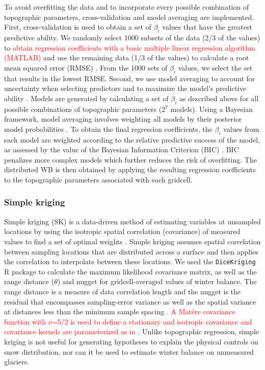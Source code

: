 \documentclass[review,oneside, letterpaper]{igs}
\begin{document}
To avoid overfitting the data and to incorporate every possible combination of topographic parameters, cross-validation and model averaging are implemented. First, cross-validation is used to obtain a set of $\beta_i$ values that have the greatest predictive ability. We randomly select 1000 subsets of the data (2/3 of the values) to  \textcolor{red}{obtain regression coefficients with a basic multiple linear regression algorithm (MATLAB)} and use the remaining data (1/3 of the values) to calculate a root mean squared error (RMSE) \citep{Kohavi1995}.
From the 1000 sets of $\beta_i$ values, we select the set that results in the lowest RMSE. Second, we use model averaging to account for uncertainty when selecting predictors and to maximize the model's predictive ability \citep{Madigan1994}.  Models are generated by calculating a set of $\beta_i$ as described above for all possible combinations of topographic parameters (2$^7$ models). Using a Bayesian framework, model averaging involves weighting all models by their posterior model probabilities \citep{Raftery1997}. To obtain the final regression coefficients, the $\beta_i$ values from each model are weighted according to the relative predictive success of the model, as assessed by the value of the Bayesian Information Criterion (BIC) \citep{Burnham2004}. BIC penalizes more complex models which further reduces the risk of overfitting. The distributed WB is then obtained by applying the resulting regression coefficients to the topographic parameters associated with each gridcell. 

\subsubsection{Simple kriging}

Simple kriging (SK) is a data-driven method of estimating variables at unsampled locations by using the isotropic spatial correlation (covariance) of measured values to find a set of optimal weights \citep{Davis1986, Li2008}. Simple kriging assumes spatial correlation between sampling locations that are distributed across a surface and then applies the correlation to interpolate between these locations. We used the \texttt{DiceKriging} R package \citep{Roustant2012} to calculate the maximum likelihood covariance matrix, as well as the range distance ($\theta$) and nugget for gridcell-averaged values of winter balance. The range distance is a measure of data correlation length and the nugget is the residual that encompasses sampling-error variance as well as the spatial variance at distances less than the minimum sample spacing \citep{Li2008}. \textcolor{red}{A Mat\'ere covariance function with $\nu$=5/2 is used to define a stationary and isotropic covariance and covariance kernels are parameterized as in \cite{Rasmussen2006}. }Unlike topographic regression, simple kriging is not useful for generating hypotheses to explain the physical controls on snow distribution, nor can it be used to estimate winter balance on unmeasured glaciers.
\end{document}
